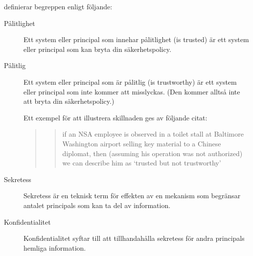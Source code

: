 \documentclass[svv,addpoints]{miunexam}
\begin{document}
\begin{questions}

  \begin{solution}
    \citet[ss.\ 13--14]{Anderson2008sea} definierar begreppen enligt följande:
    \begin{description}
      \item[Pålitlighet] Ett system eller principal som innehar pålitlighet 
        (\foreignlanguage{english}{is trusted}) är ett system eller principal 
        som kan bryta din säkerhetspolicy.

      \item[Pålitlig] Ett system eller principal som är pålitlig 
        (\foreignlanguage{english}{is trustworthy}) är ett system eller 
        principal som inte kommer att misslyckas.
        (Den kommer alltså inte att bryta din säkerhetspolicy.)

        Ett exempel för att illustrera skillnaden ges av följande citat: 
        \begin{quote}
          \blockcquote[s.\ 13]{Anderson2008sea}{%
            if an NSA employee is observed in a toilet stall at Baltimore 
            Washington airport selling key material to a Chinese diplomat, then 
            (assuming his operation was not authorized) we can describe him as 
            `trusted but not trustworthy'
          }.
        \end{quote}

      \item[Sekretess] Sekretess är en teknisk term för effekten av en mekanism 
        som begränsar antalet principals som kan ta del av information.

      \item[Konfidentialitet] Konfidentialitet syftar till att tillhandahålla 
        sekretess för andra principals hemliga information.


\end{description}
\end{solution}
\end{questions}
\end{document}

